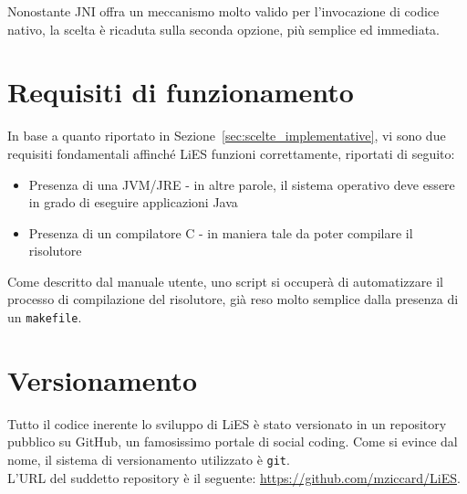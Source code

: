 \documentclass[10pt, a4paper]{article}
\begin{document}
Nonostante JNI offra un meccanismo molto valido per l'invocazione di codice nativo, la scelta è ricaduta sulla seconda opzione, più semplice ed immediata.


\section{Requisiti di funzionamento}
\label{sec:requisiti_funzionamento}

In base a quanto riportato in Sezione~\ref{sec:scelte_implementative}, vi sono due requisiti fondamentali affinché LiES funzioni correttamente, riportati di seguito:
\begin{itemize}
	\item Presenza di una JVM/JRE - in altre parole, il sistema operativo deve essere in grado di eseguire applicazioni Java
	\item Presenza di un compilatore C - in maniera tale da poter compilare il risolutore
\end{itemize}

Come descritto dal manuale utente, uno script si occuperà di automatizzare il processo di compilazione del risolutore, già reso molto semplice dalla presenza di un \verb+makefile+.


\section{Versionamento}
\label{sec:versionamento}

Tutto il codice inerente lo sviluppo di LiES è stato versionato in un repository pubblico su GitHub, un famosissimo portale di social coding. Come si evince dal nome, il sistema di versionamento utilizzato è \verb+git+.\\

L'URL del suddetto repository è il seguente: \url{https://github.com/mziccard/LiES}.

\end{document}
